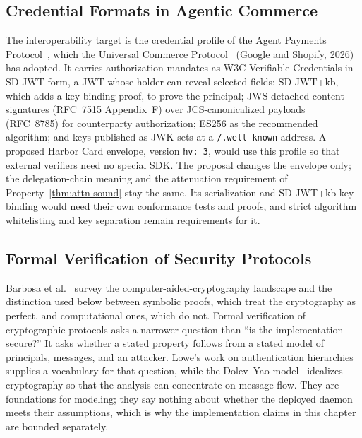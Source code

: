 \documentclass[11pt,a4paper]{article}
\theoremstyle{definition}
\begin{document}
\subsection{Credential Formats in Agentic Commerce}\label{app:credential-formats}

The interoperability target is the credential profile of the Agent Payments
Protocol~, which the Universal Commerce
Protocol~ (Google and Shopify, 2026) has adopted. It carries
authorization mandates as W3C Verifiable Credentials in SD-JWT form, a JWT
whose holder can reveal selected fields: SD-JWT+kb, which adds a key-binding
proof, to prove the principal; JWS detached-content signatures (RFC~7515
Appendix~F) over JCS-canonicalized payloads (RFC~8785) for counterparty
authorization; ES256 as the recommended algorithm; and keys published as JWK
sets at a \texttt{/.well-known} address. A proposed Harbor Card envelope,
version \texttt{hv:~3}, would use this profile so that external verifiers need
no special SDK.
The proposal changes the envelope only; the delegation-chain meaning and the
attenuation requirement of Property~\ref{thm:attn-sound} stay the same. Its
serialization and SD-JWT+kb key binding would need their own conformance tests
and proofs, and strict algorithm whitelisting and key separation remain
requirements for it.

\subsection{Formal Verification of Security Protocols}

Barbosa et al.~ survey the computer-aided-cryptography
landscape and the distinction used below between symbolic proofs, which treat
the cryptography as perfect, and computational ones, which do not.
Formal verification of cryptographic protocols asks a narrower question than
``is the implementation secure?'' It asks whether a stated property follows
from a stated model of principals, messages, and an attacker. Lowe's work on
authentication hierarchies~ supplies a vocabulary for
that question, while the Dolev--Yao model~
idealizes cryptography so that the analysis can concentrate on message flow.
They are foundations for modeling; they say nothing about whether the deployed
daemon meets their assumptions, which is why the implementation claims in this
chapter are bounded separately.
\end{document}

